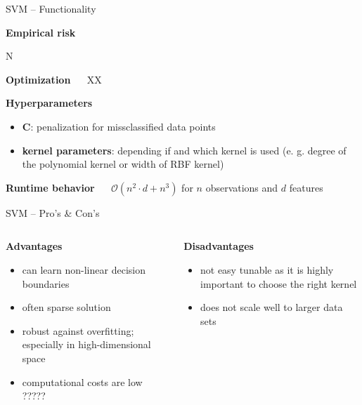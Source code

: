\documentclass[11pt,compress,t,notes=noshow, xcolor=table]{beamer}
\newcommand{\highlight}[1]{\textcolor{highlightcol}{\textbf{#1}}}
\newcommand{\positem}{\item[$\highlight{+}$]}
\newcommand{\negitem}{\item[$\highlight{-}$]}
\newcommand{\conclbox}[1]{\fbox{\parbox{\textwidth}{\centering\textbf{#1}}}}
\begin{document}

\begin{frame}{SVM -- Functionality}

\footnotesize

\highlight{Empirical risk}

N

\medskip

\highlight{Optimization} ~~
XX

\medskip

\highlight{Hyperparameters}

\begin{itemize}
  \item \textbf{C}: penalization for missclassified data points 
  \item \textbf{kernel parameters}: depending if and which kernel is used (e. g. degree of the polynomial kernel or width of RBF kernel)

\end{itemize}

\medskip

\highlight{Runtime behavior} ~~ $\mathcal{O}(n^2 \cdot d + n^3)$ for $n$ 
observations and $d$ features

\end{frame}


\begin{frame}{SVM -- Pro's \& Con's}

\footnotesize


\begin{columns}[onlytextwidth]
  \begin{column}{0.5\textwidth}
    \highlight{Advantages}
    \footnotesize
    \begin{itemize}
      \positem can learn non-linear decision boundaries
      \positem often sparse solution
      \positem robust against overfitting; especially in high-dimensional space 
      \positem computational costs are low ????? 
    \end{itemize}
  \end{column}

  \begin{column}{0.5\textwidth}
    \highlight{Disadvantages}
    \footnotesize
    \begin{itemize}
      \negitem not easy tunable as it is highly important to choose the right kernel
      \negitem does not scale well to larger data sets
    \end{itemize}
  \end{column}
\end{columns}

\vfill

\small

\conclbox{XX}

\end{frame}
\end{document}
